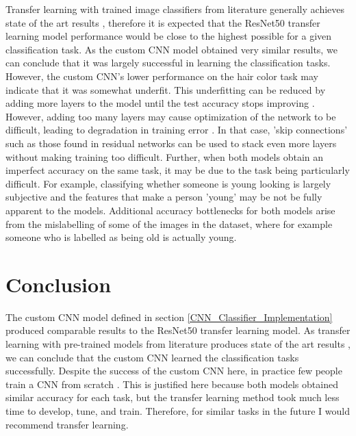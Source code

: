 \documentclass[10pt,twocolumn,letterpaper]{article}
\begin{document}
Transfer learning with trained image classifiers from literature generally achieves state of the art results \cite{sharif2014cnn}, therefore it is expected that the ResNet50 transfer learning model performance would be close to the highest possible for a given classification task. As the custom CNN model obtained very similar results, we can conclude that it was largely successful in learning the classification tasks. However, the custom CNN's lower performance on the hair color task may indicate that it was somewhat underfit. This underfitting can be reduced by adding more layers to the model until the test accuracy stops improving \cite{DBLP:journals/corr/abs-1206-5533}. However, adding too many layers may cause optimization of the network to be difficult, leading to degradation in training error \cite{DBLP:journals/corr/HeZRS15}. In that case, 'skip connections' such as those found in residual networks \cite{DBLP:journals/corr/HeZRS15} can be used to stack even more layers without making training too difficult. Further, when both models obtain an imperfect accuracy on the same task, it may be due to the task being particularly difficult. For example, classifying whether someone is young looking is largely subjective and the features that make a person 'young' may be not be fully apparent to the models. Additional accuracy bottlenecks for both models arise from the mislabelling of some of the images in the dataset, where for example someone who is labelled as being old is actually young.

\section{Conclusion} \label{conclusion}

The custom CNN model defined in section \ref{CNN_Classifier_Implementation} produced comparable results to the ResNet50 transfer learning model. As transfer learning with pre-trained models from literature produces state of the art results \cite{sharif2014cnn}, we can conclude that the custom CNN learned the classification tasks successfully. Despite the success of the custom CNN here, in practice few people train a CNN from scratch \cite{karpathy_2018_transfer}. This is justified here because both models obtained similar accuracy for each task, but the transfer learning method took much less time to develop, tune, and train. Therefore, for similar tasks in the future I would recommend transfer learning.
\end{document}
